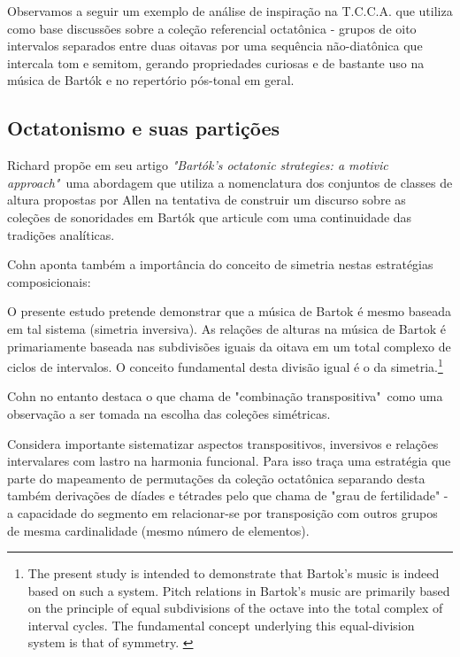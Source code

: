 \documentclass[
	12pt,				%
	openright,			%
	twoside,			%
	a4paper,			%
	english,			%
	french,				%
	spanish,			%
	brazil				%
	]{abntex2}
\begin{document}
Observamos a seguir um exemplo de análise de inspiração na T.C.C.A. que utiliza como base discussões sobre a coleção referencial octatônica - grupos de oito intervalos separados entre duas oitavas por uma sequência não-diatônica que intercala tom e semitom, gerando propriedades curiosas e de bastante uso na música de Bartók e no repertório pós-tonal em geral.


\subsection{Octatonismo e suas partições}
\label{octa}

Richard  propõe em seu artigo \textit{"Bartók's octatonic strategies: a motivic approach"}\ uma abordagem que utiliza a nomenclatura dos conjuntos de classes de altura propostas por Allen  na tentativa de construir um discurso sobre as coleções de sonoridades em Bartók que articule com uma continuidade das tradições analíticas.

Cohn aponta também a importância do conceito de simetria nestas estratégias composicionais:

\begin{citacao}
O presente estudo pretende demonstrar que a música de Bartok é mesmo baseada em tal sistema (simetria inversiva). As relações de alturas na música de Bartok é primariamente baseada nas subdivisões iguais da oitava em um total complexo de ciclos de intervalos. O conceito fundamental desta divisão igual é o da simetria.\cite{cohn1988inversional}\footnote{ The present study is intended to demonstrate that Bartok's music is indeed based on such a system. Pitch relations in Bartok's music are primarily based on the principle of equal subdivisions of the octave into the total complex of interval cycles. The fundamental concept underlying this equal-division system is that of symmetry. \cite{cohn1988inversional}}
\end{citacao}

Cohn no entanto destaca o que chama de "combinação transpositiva"\ como uma observação a ser tomada na escolha das coleções simétricas.

Considera importante sistematizar aspectos transpositivos, inversivos e relações intervalares com lastro na harmonia funcional. Para isso traça uma estratégia que parte do mapeamento de permutações da coleção octatônica separando desta também derivações de díades e tétrades pelo que chama de "grau de fertilidade"\cite[p. 268]{cohn1991bartok} - a capacidade do segmento em relacionar-se por transposição com outros grupos de mesma cardinalidade (mesmo número de elementos).
\end{document}
